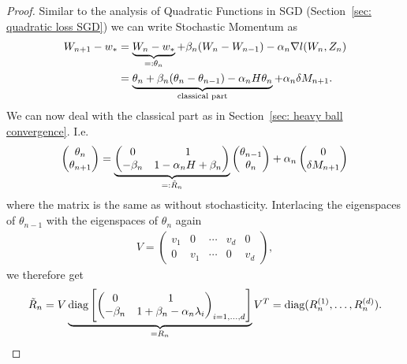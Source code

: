 \begin{proof}
	Similar to the analysis of Quadratic Functions in SGD (Section~\ref{sec: quadratic loss SGD})
	we can write Stochastic Momentum as
	\begin{align*}
		W_{n+1} - w_*
		&= \underbrace{W_n - w_*}_{=:\theta_n}
		+ \beta_n(W_n - W_{n-1})
		- \alpha_n \nabla l(W_n, Z_n)\\
		&= \underbrace{\theta_n + \beta_n(\theta_n-\theta_{n-1}) - \alpha_n H\theta_n}_{\text{classical part}}
		+ \alpha_n \delta M_{n+1}.
	\end{align*}
	We can now deal with the classical part as in Section~\ref{sec: heavy ball convergence}. I.e.
	\begin{align*}
		\begin{pmatrix}
			\theta_n \\
			\theta_{n+1}
		\end{pmatrix}
		= \underbrace{\begin{pmatrix}
			0 & 1\\
			-\beta_n & 1-\alpha_n H + \beta_n
		\end{pmatrix}}_{=:\tilde{R}_n}
		\begin{pmatrix}
			\theta_{n-1}\\
			\theta_n
		\end{pmatrix}
		+ \alpha_n \begin{pmatrix}
			0\\
			\delta M_{n+1}
		\end{pmatrix}
	\end{align*}
	where the matrix is the same as without stochasticity. Interlacing the eigenspaces
	of \(\theta_{n-1}\) with the eigenspaces of \(\theta_n\) again
	\begin{align*}
		V = \begin{pmatrix}
			v_1 & 0 & \cdots & v_d & 0 \\
			0 & v_1 & \cdots & 0 & v_d
		\end{pmatrix},
	\end{align*}
	we therefore get
	\begin{align*}
		\tilde{R}_n
		= V \underbrace{\text{diag}\left[\begin{pmatrix}
			0 & 1 \\
			-\beta_n & 1+\beta_n - \alpha_n\lambda_i	
		\end{pmatrix}_{i=1,\dots,d}\right]}_{=R_n}V^T
		= \text{diag}(R_n^{(1)}, \dots, R_n^{(d)}).
	\end{align*}

\end{proof}
